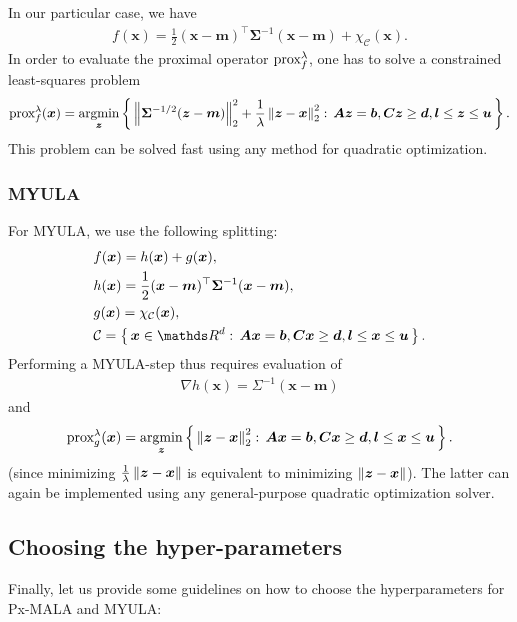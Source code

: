 \documentclass[10pt]{article}
\numberwithin{equation}{section}
\begin{document}
In our particular case, we have
\begin{align*}
f(\bm x) = \frac{1}{2}(\bm x - \bm m)^\top \bm \Sigma^{-1} (\bm x - \bm m) + \chi_{\mathcal C}(\bm x).
\end{align*}
In order to evaluate the proximal operator $\text{prox}_{f}^{\lambda}$, one has to solve a constrained least-squares problem
\begin{align*}
\text{prox}_{f}^{\lambda}(\bm x) = \operatorname*{argmin}_{\bm z} \left\{\,\left\|\bm \Sigma^{-1/2}(\bm z - \bm m)\right\|_2^2 + \frac{1}{\lambda} \left\|\bm z - \bm x\right\|_2^2:\, \bm A \bm z = \bm b, \bm C \bm z \geq \bm d, \bm l \leq \bm z \leq \bm u\,\right\}.
\end{align*}
This problem can be solved fast using any method for quadratic optimization.

\subsubsection{MYULA}

For MYULA, we use the following splitting:
\begin{align*}
& f(\bm x) = h(\bm x) + g(\bm x), \\
& h(\bm x) = \frac{1}{2} (\bm x - \bm m)^\top \bm \Sigma^{-1} (\bm x - \bm m), \\
& g(\bm x) = \chi_{\mathcal C}(\bm x), \\
& \mathcal C = \Set{\bm x \in \R^d}{\bm A \bm x = \bm b, \bm C \bm x \geq \bm d, \bm l \leq \bm x \leq \bm u}.
\end{align*}
Performing a MYULA-step thus requires evaluation of
\begin{align*}
\nabla h(\bm x) = \Sigma^{-1}(\bm x - \bm m)
\end{align*}
and
\begin{align*}
\text{prox}_{g}^{\lambda}(\bm x) = \operatorname*{argmin}_{\bm z} \left\{\,\left\|\bm z - \bm x\right\|_2^2:\, \bm A \bm x = \bm b, \bm C \bm x \geq \bm d, \bm l \leq \bm x \leq \bm u\,\right\}.
\end{align*}
(since minimizing $\frac{1}{\lambda} \left\|\bm z - \bm x\right\|$ is equivalent to minimizing $\left\|\bm z - \bm x\right\|$). The latter can again be implemented using any general-purpose quadratic optimization solver.

\subsection{Choosing the hyper-parameters}

Finally, let us provide some guidelines on how to choose the hyperparameters for Px-MALA and MYULA:
\end{document}
